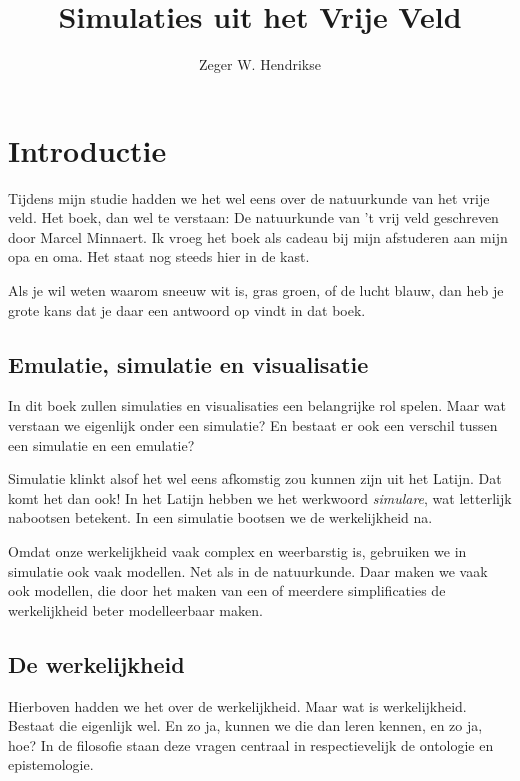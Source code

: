 \documentclass{article}      %
\title{Simulaties uit het Vrije Veld}  %
\author{Zeger W. Hendrikse}      %
\begin{document}

\maketitle                   %


\section{Introductie}

Tijdens mijn studie hadden we het wel eens over de natuurkunde van het vrije veld.
Het boek, dan wel te verstaan: De natuurkunde van 't vrij veld geschreven door Marcel Minnaert.
Ik vroeg het boek als cadeau bij mijn afstuderen aan mijn opa en oma. Het staat
nog steeds hier in de kast. 

Als je wil weten waarom sneeuw wit is, gras groen, of de lucht blauw, dan heb je
grote kans dat je daar een antwoord op vindt in dat boek. 

                             
\subsection{Emulatie, simulatie en visualisatie}

In dit boek zullen simulaties en visualisaties een belangrijke rol spelen.
Maar wat verstaan we eigenlijk onder een simulatie? En bestaat er ook een 
verschil tussen een simulatie en een emulatie?

Simulatie klinkt alsof het wel eens afkomstig zou kunnen zijn uit het Latijn.
Dat komt het dan ook! In het Latijn hebben we het werkwoord {\it simulare}, 
wat letterlijk nabootsen betekent. In een simulatie bootsen we de werkelijkheid
na. 

Omdat onze werkelijkheid vaak complex en weerbarstig is, gebruiken we in 
simulatie ook vaak modellen. Net als in de natuurkunde. Daar maken we vaak
ook modellen, die door het maken van een of meerdere simplificaties de 
werkelijkheid beter modelleerbaar maken.


\subsection{De werkelijkheid}

Hierboven hadden we het over de werkelijkheid. Maar wat is werkelijkheid. 
Bestaat die eigenlijk wel. En zo ja, kunnen we die dan leren kennen, en zo ja, 
hoe? In de filosofie staan deze vragen centraal in respectievelijk 
de ontologie en epistemologie. 
\end{document}
